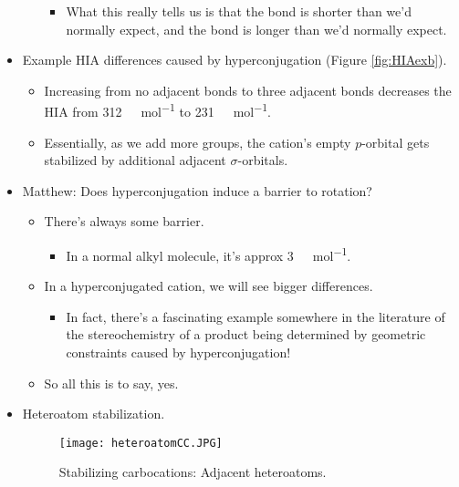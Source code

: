 \documentclass[../notes.tex]{subfiles}
\begin{document}
\begin{itemize}
\begin{itemize}
        \begin{itemize}
            \item What this really tells us is that the  bond is shorter than we'd normally expect, and the  bond is longer than we'd normally expect.
        \end{itemize}
    \end{itemize}
    \pagebreak
    \item Example HIA differences caused by hyperconjugation (Figure \ref{fig:HIAexb}).
    \begin{itemize}
        \item Increasing from no adjacent  bonds to three adjacent  bonds decreases the HIA from \SI[per-mode=symbol]{312}{\kilo\calorie\per\mole} to \SI[per-mode=symbol]{231}{\kilo\calorie\per\mole}.
        \item Essentially, as we add more  groups, the cation's empty $p$-orbital gets stabilized by additional adjacent $\sigma$-orbitals.
    \end{itemize}
    \item Matthew: Does hyperconjugation induce a barrier to rotation?
    \begin{itemize}
        \item There's always some barrier.
        \begin{itemize}
            \item In a normal alkyl molecule, it's approx \SI[per-mode=symbol]{3}{\kilo\calorie\per\mole}.
        \end{itemize}
        \item In a hyperconjugated cation, we will see bigger differences.
        \begin{itemize}
            \item In fact, there's a fascinating example somewhere in the literature of the stereochemistry of a product being determined by geometric constraints caused by hyperconjugation!
        \end{itemize}
        \item So all this is to say, yes.
    \end{itemize}
    \item Heteroatom stabilization.
    \begin{figure}[h!]
        \centering
        \texttt{[image: heteroatomCC.JPG]}
        \caption{Stabilizing carbocations: Adjacent heteroatoms.}
        \label{fig:heteroatomCC}
    \end{figure}

\end{itemize}
\end{document}
